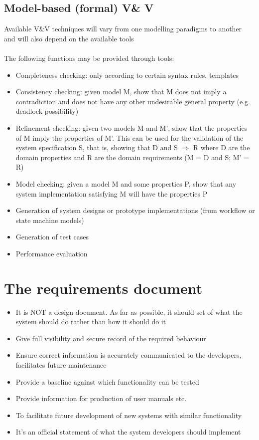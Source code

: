 \documentclass{article}[18pt]
\begin{document}
\subsection{Model-based (formal) V\& V}
Available V\&V techniques will vary from one modelling paradigms to another and will also depend on the available tools\\
\\
The following functions may be provided through tools:
\begin{itemize}
	\item Completeness checking: only according to certain syntax rules, templates
	\item Consistency checking: given model M, show that M does not imply a contradiction  and does not have any other undesirable general property (e.g. deadlock possibility)
	\item Refinement checking: given two models M and M’, show that the properties of M imply the properties of M’. This can be used for the validation of the system specification S, that is, showing that  D and S $\Rightarrow$ R where D are the domain properties and R are the domain requirements (M = D and S; M’ = R)
	\item Model checking: given a model M and some properties P, show that any system implementation satisfying M will have the properties P
	\item Generation of system designs or prototype implementations (from workflow or state machine models)
	\item Generation of test cases 
	\item Performance evaluation
\end{itemize}
\section{The requirements document}
\begin{itemize}
	\item It is NOT a design document. As far as possible, it should set of what the system should do rather than how it should do it
	\item Give full visibility and secure record of the required behaviour
	\item Ensure correct information is accurately communicated to the developers, facilitates future maintenance
	\item Provide a baseline against which functionality can be tested
	\item Provide information for production of user manuals etc.
	\item To facilitate future development of new systems with similar functionality
	\item It’s an official statement of what the system developers should implement
\end{itemize}
\end{document}
